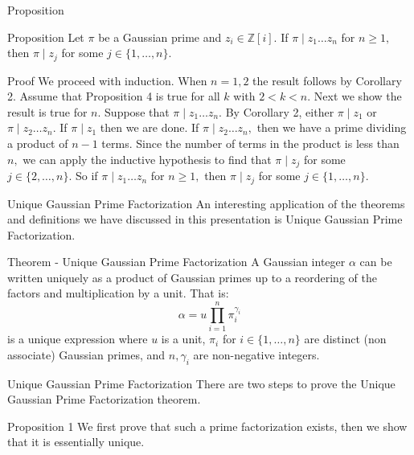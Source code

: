 \begin{frame}{Proposition}
    \begin{block}{Proposition}
    Let $\pi$ be a Gaussian prime and $z_i\in\mathbb{Z}[i].$ If $\pi\mid z_1 \ldots z_n$ for $n\geq 1,$ then $\pi\mid z_j$ for some $j\in\{1,\ldots,n\}$.
    \end{block}
    \begin{block}{Proof}
    We proceed with induction. When $n=1,2$ the result follows by Corollary 2. Assume that Proposition 4 is true for all $k$ with $2<k<n.$ Next we show the result is true for $n.$ Suppose that $\pi\mid z_1\ldots z_n.$ By Corollary 2, either $\pi\mid z_1$ or $\pi\mid z_2\ldots z_n.$ If $\pi\mid z_1$ then we are done. If $\pi\mid z_2\ldots z_n,$ then we have a prime dividing a product of $n-1$ terms. Since the number of terms in the product is less than $n,$ we can apply the inductive hypothesis to find that $\pi \mid z_j$ for some $j\in\{2,\ldots, n\}.$ So if $\pi\mid z_1 \ldots z_n$ for $n\geq 1,$ then $\pi\mid z_j$ for some $j\in\{1,\ldots,n\}$. 
    \end{block}
\end{frame}


\begin{frame}{Unique Gaussian Prime Factorization}
    An interesting application of the theorems and definitions we have discussed in this presentation is Unique Gaussian Prime Factorization. 
    
    \begin{block}{Theorem - Unique Gaussian Prime Factorization}
 A Gaussian integer $\alpha$ can be written uniquely as a product of Gaussian primes up to a reordering of the factors and multiplication by a unit. That is:
$$\alpha = u\prod_{i=1}^{n}\pi_i^{\gamma_i}$$
is a unique expression where $u$ is a unit, $\pi_i$ for $i\in\{1,\ldots,n\}$ are distinct (non associate) Gaussian primes, and $n,\gamma_i$ are non-negative integers.

    \end{block}
\end{frame}


\begin{frame}{Unique Gaussian Prime Factorization}
There are two steps to prove the Unique Gaussian Prime Factorization theorem.
    \begin{block}{Proposition 1}
 We first prove that such a prime factorization exists, then we show that it is essentially unique.
    \end{block}
\end{frame}

